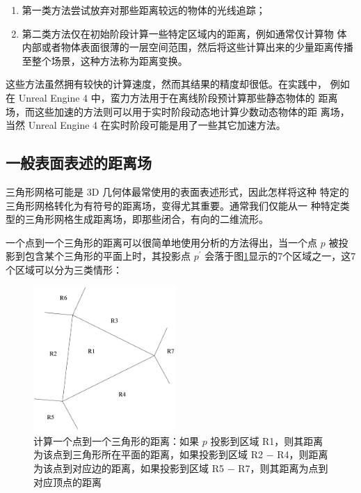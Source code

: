 \begin{enumerate}
	\item 第一类方法尝试放弃对那些距离较远的物体的光线追踪；
	\item 第二类方法仅在初始阶段计算一些特定区域内的距离，例如通常仅计算物 体内部或者物体表面很薄的一层空间范围，然后将这些计算出来的少量距离传播至整个场景，这种方法称为距离变换。
\end{enumerate}

这些方法虽然拥有较快的计算速度，然而其结果的精度却很低。在实践中， 例如在 Unreal Engine 4 中，蛮力方法用于在离线阶段预计算那些静态物体的 距离场，而这些加速的方法则可以用于实时阶段动态地计算少数动态物体的距 离场，当然 Unreal Engine 4 在实时阶段可能是用了一些其它加速方法。



\subsection{一般表面表述的距离场}
三角形网格可能是 3D 几何体最常使用的表面表述形式，因此怎样将这种 特定的三角形网格转化为有符号的距离场，变得尤其重要。通常我们仅能从一 种特定类型的三角形网格生成距离场，即那些闭合，有向的二维流形。

一个点到一个三角形的距离可以很简单地使用分析的方法得出，当一个点 $p$ 被投影到包含某个三角形的平面上时，其投影点 $p^{'}$ 会落于图\ref{f:df-calculating-distance-to-triangle}显示的7个区域之一，这7个区域可以分为三类情形\cite{a:3d-distance-fields-a-survey}：

\begin{figure}
	\sidecaption
	\includegraphics[width=0.48\textwidth]{figures/df/calculating-distance-to-triangle}
	\caption{计算一个点到一个三角形的距离：如果 $p$ 投影到区域 R1，则其距离为该点到三角形所在平面的距离，如果投影到区域 R2 − R4，则距离为该点到对应边的距离，如果投影到区域 R5 − R7，则其距离为点到对应顶点的距离}
	\label{f:df-calculating-distance-to-triangle}
\end{figure}

